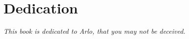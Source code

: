 
\chapter{Dedication}

\textit{\large This book is dedicated to Arlo, that you may not be deceived.}

